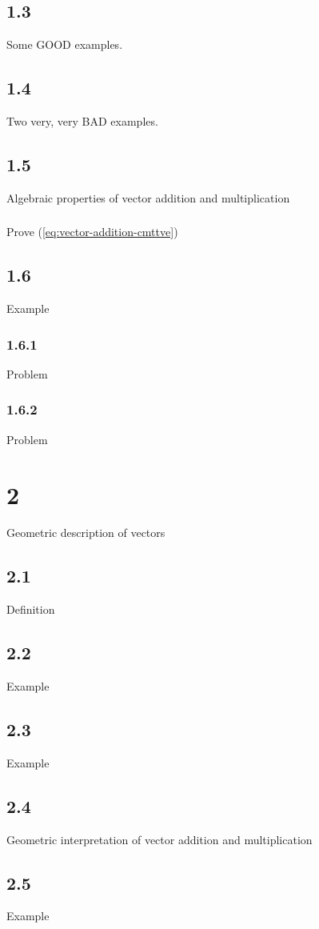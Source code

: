 \subsection{1.3}{Some GOOD examples. }
\subsection{1.4}{Two very, very BAD examples. }
\subsection{1.5}{Algebraic properties of vector addition and multiplication}
\subsubsection{}{Prove (\ref {eq:vector-addition-cmttve})}
\subsection{1.6}{Example}
\subsubsection{1.6.1}{Problem}
\subsubsection{1.6.2}{Problem}
\section{2}{Geometric description of vectors}
\subsection{2.1}{Definition}
\subsection{2.2}{Example}
\subsection{2.3}{Example}
\subsection{2.4}{Geometric interpretation of vector addition and multiplication}
\subsection{2.5}{Example}
